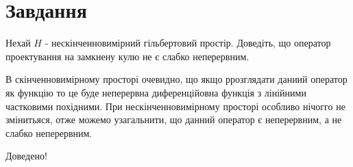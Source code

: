
\chapter{Завдання \theHchapter}

\begin{tcolorbox}[title=Завдання]
    Нехай $H$ - нескінченновимірний гільбертовий простір. 
    Доведіть, що оператор проектування на замкнену кулю 
    не є слабко неперервним.
\end{tcolorbox}



В скінченновимірному просторі очевидно, що якщо ррозглядати даниий
оператор як функцію то це буде неперервна диференційовна функція з 
лінійними частковими похідними. При нескінченновимірному просторі 
особливо нічогго не змінитьяся, отже можемо узагальнити, що данний 
оператор є неперервним, а не слабко неперервним.


Доведено!